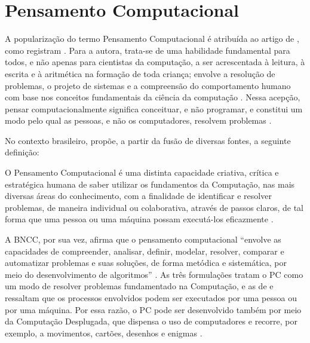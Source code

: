 

\section{Pensamento Computacional}
\label{sec-referencial-pc}

A popularização do termo Pensamento Computacional é atribuída ao artigo de , como registram . Para a autora, trata-se de uma habilidade fundamental para todos, e não apenas para cientistas da computação, a ser acrescentada à leitura, à escrita e à aritmética na formação de toda criança; envolve a resolução de problemas, o projeto de sistemas e a compreensão do comportamento humano com base nos conceitos fundamentais da ciência da computação \cite[p.~33]{wing2006}. Nessa acepção, pensar computacionalmente significa conceituar, e não programar, e constitui um modo pelo qual as pessoas, e não os computadores, resolvem problemas \cite[p.~35]{wing2006}.

No contexto brasileiro,  propõe, a partir da fusão de diversas fontes, a seguinte definição:

\begin{citacao}
O Pensamento Computacional é uma distinta capacidade criativa, crítica e estratégica humana de saber utilizar os fundamentos da Computação, nas mais diversas áreas do conhecimento, com a finalidade de identificar e resolver problemas, de maneira individual ou colaborativa, através de passos claros, de tal forma que uma pessoa ou uma máquina possam executá-los eficazmente \cite[p.~29]{brackmann2017}.
\end{citacao}

\noindent A BNCC, por sua vez, afirma que o pensamento computacional ``envolve as capacidades de compreender, analisar, definir, modelar, resolver, comparar e automatizar problemas e suas soluções, de forma metódica e sistemática, por meio do desenvolvimento de algoritmos'' \cite[p.~474]{brasil2018bncc}. As três formulações tratam o PC como um modo de resolver problemas fundamentado na Computação, e as de  e  ressaltam que os processos envolvidos podem ser executados por uma pessoa ou por uma máquina. Por essa razão, o PC pode ser desenvolvido também por meio da Computação Desplugada, que dispensa o uso de computadores e recorre, por exemplo, a movimentos, cartões, desenhos e enigmas \cite[p.~50]{brackmann2017}.

